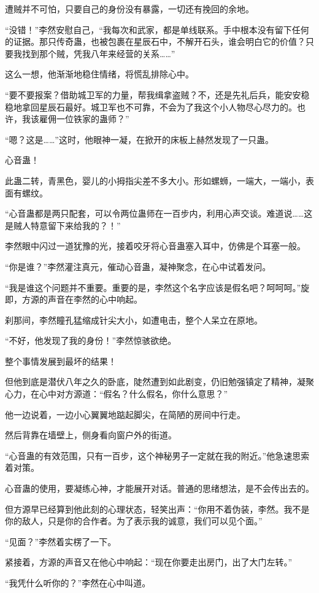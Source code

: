 \begin{this_body}
遭贼并不可怕，只要自己的身份没有暴露，一切还有挽回的余地。

“没错！”李然安慰自己，“我每次和武家，都是单线联系。手中根本没有留下任何的证据。那只传奇蛊，也被包裹在星辰石中，不解开石头，谁会明白它的价值？只要我找到那个贼，凭我八年来经营的关系……”

这么一想，他渐渐地稳住情绪，将慌乱排除心中。

“要不要报案？借助城卫军的力量，帮我缉拿盗贼？不，还是先礼后兵，能安安稳稳地拿回星辰石最好。城卫军也不可靠，不会为了我这个小人物尽心尽力的。也许，我该雇佣一位铁家的蛊师？”

“嗯？这是……”这时，他眼神一凝，在掀开的床板上赫然发现了一只蛊。

心音蛊！

此蛊二转，青黑色，婴儿的小拇指尖差不多大小。形如螺蛳，一端大，一端小，表面有螺纹。

“心音蛊都是两只配套，可以令两位蛊师在一百步内，利用心声交谈。难道说……这是贼人特意留下来给我的？！”

李然眼中闪过一道犹豫的光，接着咬牙将心音蛊塞入耳中，仿佛是个耳塞一般。

“你是谁？”李然灌注真元，催动心音蛊，凝神聚念，在心中试着发问。

“我是谁这个问题并不重要。重要的是，李然这个名字应该是假名吧？呵呵呵。”旋即，方源的声音在李然的心中响起。

刹那间，李然瞳孔猛缩成针尖大小，如遭电击，整个人呆立在原地。

“不好，他发现了我的身份！”李然惊骇欲绝。

整个事情发展到最坏的结果！

但他到底是潜伏八年之久的卧底，陡然遭到如此剧变，仍旧勉强镇定了精神，凝聚心力，在心中对方源道：“假名？什么假名，你什么意思？”

他一边说着，一边小心翼翼地踮起脚尖，在简陋的房间中行走。

然后背靠在墙壁上，侧身看向窗户外的街道。

“心音蛊的有效范围，只有一百步，这个神秘男子一定就在我的附近。”他急速思索着对策。

心音蛊的使用，要凝练心神，才能展开对话。普通的思绪想法，是不会传出去的。

但方源早已经算到他此刻的心理状态，轻笑出声：“你用不着伪装，李然。我不是你的敌人，只是你的合作者。为了表示我的诚意，我们可以见个面。”

“见面？”李然着实楞了一下。

紧接着，方源的声音又在他心中响起：“现在你要走出房门，出了大门左转。”

“我凭什么听你的？”李然在心中叫道。


\end{this_body}
